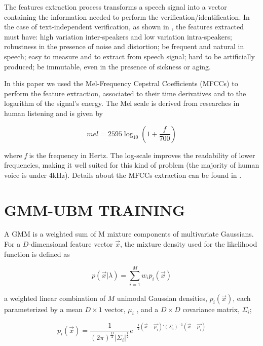 \documentclass[a4paper,twocolumn]{article}
\begin{document}
The features extraction process transforms a speech signal into a vector containing the information needed to perform the verification/identification. In the case of text-independent verification, as shown in \cite{pinheiro_2013}, the features extracted must have: high variation inter-speakers and low variation intra-speakers; robustness in the presence of noise and distortion; be frequent and natural in speech; easy to measure and to extract from speech signal; hard to be artificially produced; be immutable, even in the presence of sickness or aging.

In this paper we used the Mel-Frequency Cepstral Coefficients (MFCCs) \cite{davis_mermelstein_1980} to perform the feature extraction, associated to their time derivatives and to the logarithm of the signal's energy. The Mel scale is derived from researches in human listening and is given by

\begin{equation}
    \label{eq:hertz_to_mel}
    mel = 2595\log_{10} (1 + \frac{f}{700})
\end{equation}

\noindent where \textit{f} is the frequency in Hertz. The log-scale improves the readability of lower frequencies, making it well suited for this kind of problem (the majority of human voice is under 4kHz). Details about the MFCCs extraction can be found in \cite{pinheiro_2013}.


\section{GMM-UBM TRAINING}

A GMM is a weighted sum of M mixture components of multivariate Gaussians. For a $D$-dimensional feature vector $\vec{x}$, the mixture density used for the likelihood function is defined as

\begin{equation}
    \label{eq:gmm_likelihood}
    p(\vec{x}|\lambda) = \sum_{i=1}^M w_i p_i(\vec{x})
\end{equation}

\noindent a weighted linear combination of $M$ unimodal Gaussian densities, $p_i(\vec{x})$, each parameterized by a mean $D\times 1$ vector, $\mu_i$ , and a $D\times D$ covariance matrix, $\Sigma_i$;

\begin{equation}
    \label{eq:gmm}
    p_i(\vec{x}) = \frac{1}{(2\pi)^\frac{D}{2}|{\Sigma_i}|^\frac{1}{2}}e^{-\frac{1}{2}(\vec{x} - \vec{\mu_i})'(\Sigma_i)^{-1}(\vec{x} - \vec{\mu_i})}
\end{equation}
\end{document}
